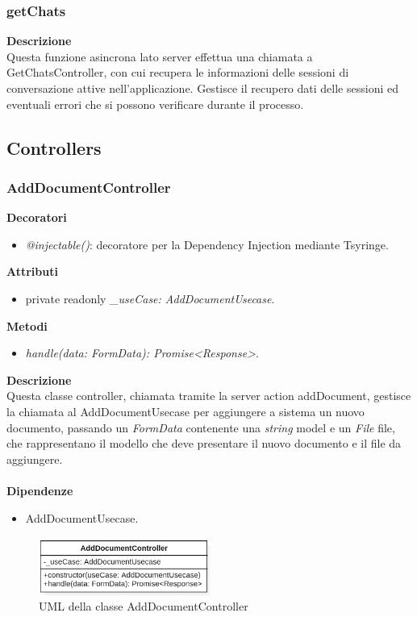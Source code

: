 \subsubsection{getChats}
\textbf{Descrizione}\\
Questa funzione asincrona lato server effettua una chiamata a GetChatsController, con cui recupera le informazioni delle sessioni di conversazione attive nell'applicazione. Gestisce il recupero dati delle sessioni ed eventuali errori che si possono verificare durante il processo.

\newpage

\subsection{Controllers} \label{subsec:controllers}
\subsubsection{AddDocumentController}
\textbf{Decoratori}
\begin{itemize}
    \item \textit{@injectable()}: decoratore per la Dependency Injection mediante Tsyringe.
\end{itemize}
\textbf{Attributi}
\begin{itemize}
    \item private readonly \textit{\_useCase: AddDocumentUsecase}.
\end{itemize}
\textbf{Metodi}
\begin{itemize}
    \item \textit{handle(data: FormData): Promise<Response>}.
\end{itemize}
\textbf{Descrizione}\\
Questa classe controller, chiamata tramite la server action addDocument, gestisce la chiamata al AddDocumentUsecase per aggiungere a sistema un nuovo documento, passando un \textit{FormData} contenente una \textit{string} model e un \textit{File} file, che rappresentano il modello che deve presentare il nuovo documento e il file da aggiungere.\\ \\
\textbf{Dipendenze}
\begin{itemize}
    \item AddDocumentUsecase.
\end{itemize}

\begin{figure}[h!]
    \centering  
    \includegraphics[width=0.5\textwidth]{AddDocumentController.png}
    \caption{UML della classe AddDocumentController}
\end{figure}

